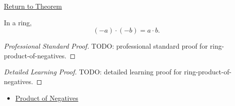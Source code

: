 \newpage
{}
\label{prf:ring-product-of-negatives}

\begin{remark*}[Return]
\hyperref[thm:ring-product-of-negatives]{Return to Theorem}
\end{remark*}

\begin{theorem*}
In a ring,
\[
(-a)\cdot(-b)=a\cdot b.
\]
\end{theorem*}

\begin{proof}[Professional Standard Proof]
\LRAProofBodyStart
TODO: professional standard proof for ring-product-of-negatives.
\end{proof}

\begin{proof}[Detailed Learning Proof]
\LRAProofBodyStart
TODO: detailed learning proof for ring-product-of-negatives.
\end{proof}

\begin{remark*}
\end{remark*}

\begin{dependencies}
\begin{itemize}
  \item \hyperref[prop:product-of-negatives]{Product of Negatives}
\end{itemize}
\end{dependencies}

\clearpage
